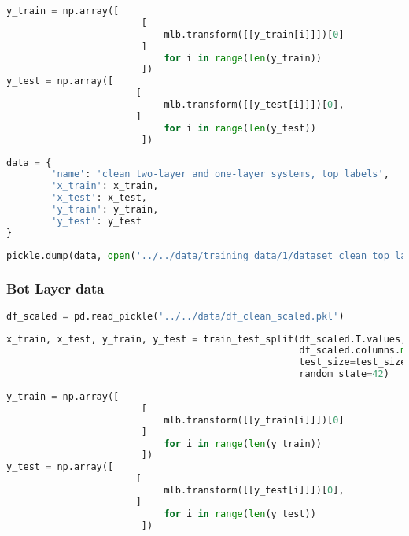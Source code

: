 \begin{lstlisting}[language=Python]
y_train = np.array([    
                        [
                            mlb.transform([[y_train[i]]])[0]
                        ] 
                            for i in range(len(y_train))
                        ])
y_test = np.array([ 
                       [
                            mlb.transform([[y_test[i]]])[0],
                       ] 
                            for i in range(len(y_test))
                        ])
\end{lstlisting}

\begin{lstlisting}[language=Python]
data = {
        'name': 'clean two-layer and one-layer systems, top labels',
        'x_train': x_train,
        'x_test': x_test,
        'y_train': y_train,
        'y_test': y_test
}
\end{lstlisting}

\begin{lstlisting}[language=Python]
pickle.dump(data, open('../../data/training_data/1/dataset_clean_top_layer.pkl', 'wb'))
\end{lstlisting}

\hypertarget{bot-layer-data}{%
\subsubsection{Bot Layer data}\label{bot-layer-data}}

\begin{lstlisting}[language=Python]
df_scaled = pd.read_pickle('../../data/df_clean_scaled.pkl')
\end{lstlisting}

\begin{lstlisting}[language=Python]
x_train, x_test, y_train, y_test = train_test_split(df_scaled.T.values,
                                                    df_scaled.columns.map(lambda x: x.split('_')[1]), # second part of the filename is the bot label
                                                    test_size=test_size_ratio,
                                                    random_state=42)
\end{lstlisting}

\begin{lstlisting}[language=Python]
y_train = np.array([    
                        [
                            mlb.transform([[y_train[i]]])[0]
                        ] 
                            for i in range(len(y_train))
                        ])
y_test = np.array([ 
                       [
                            mlb.transform([[y_test[i]]])[0],
                       ] 
                            for i in range(len(y_test))
                        ])
\end{lstlisting}


